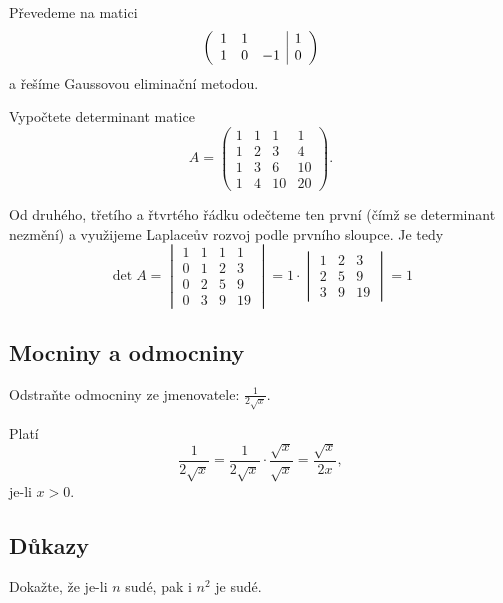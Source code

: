 \begin{reseni}
Převedeme na matici
$$
\left (
\begin{array}{c c c | c }
1 & 1 & & 1\\
1  & 0 &-1  &0
\end{array}
\right )
$$
a řešíme Gaussovou eliminační metodou.
\end{reseni}

\begin{priklad}
Vypočtete determinant matice
$$A=\begin{pmatrix}
    1  &1 &1 &1\\
    1 &2 &3 &4 \\
    1 &3 &6 &10\\
    1 &4 &10 &20
\end{pmatrix}.$$
\end{priklad}

\begin{reseni}
Od druhého, třetího a řtvrtého řádku odečteme ten první (čímž se determinant nezmění)
a využijeme Laplaceův rozvoj podle prvního sloupce. Je tedy
$$\det A = \begin{vmatrix}
    1 &1 &1 &1\\
    0 &1 &2 &3 \\
    0 &2 &5 &9 \\
    0 &3 &9 &19
\end{vmatrix}=1 \cdot \begin{vmatrix}
1 &2 &3 \\
2 &5 &9\\
3 &9 &19
\end{vmatrix}=1$$
\end{reseni}

\subsection{Mocniny a odmocniny}
\begin{priklad}
Odstraňte odmocniny ze jmenovatele: $\frac{1}{2 \sqrt{x} }.$
\end{priklad}

\begin{reseni}
Platí
$$\frac{1}{2\sqrt{x} }=\frac{1}{2\sqrt{x} }\cdot \frac{\sqrt{x} }{\sqrt{x} }=\frac{\sqrt{x} }{2x},$$
je-li $x>0.$
\end{reseni}

\subsection{Důkazy}
\begin{priklad}
Dokažte, že je-li $n$ sudé, pak i $n^2$ je sudé.
\end{priklad}

